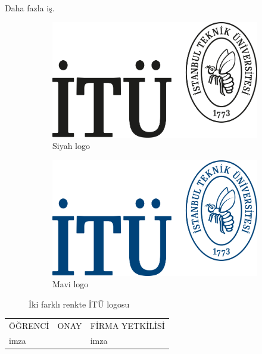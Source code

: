 \documentclass[12pt,a4paper]{report}
\begin{document}
\paragraph{} Daha fazla iş.

\shorthandoff{=} %
\begin{figure}[h!]
  \centering
  \begin{subfigure}[b]{0.4\linewidth}
    \includegraphics[width=\linewidth]{black}
    \caption{Siyah logo}
  \end{subfigure}
  \begin{subfigure}[b]{0.4\linewidth}
    \includegraphics[width=\linewidth]{blue}
    \caption{Mavi logo}
  \end{subfigure}
  \caption{İki farklı renkte İTÜ logosu}
  \label{fig:coffee}
\end{figure}
\shorthandoff{=} %

\mbox{}
\vfill
\begin{center}
\begin{tabular}{|>{\centering}m{3.6cm}|>{\centering}m{7.4cm}|>{\centering}m{4cm}|}
ÖĞRENCİ&ONAY&FİRMA YETKİLİSİ
\tabularnewline
imza&&imza
\end{tabular}
\end{center}

\end{document}
